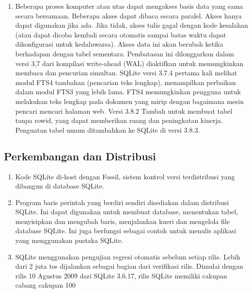 \begin{enumerate}
\begin{enumerate}
			\item Beberapa proses komputer atau utas dapat mengakses basis data yang sama secara bersamaan. Beberapa akses dapat dibaca secara paralel. Akses hanya dapat digunakan jika ada. Jika tidak, akses tulis gagal dengan kode kesalahan (atau dapat dicoba kembali secara otomatis sampai batas waktu dapat dikonfigurasi untuk kedaluwarsa). Akses data ini akan berubah ketika berhadapan dengan tabel sementara. Pembatasan ini dilonggarkan dalam versi 3,7 dari kompilasi write-ahead (WAL) diaktifkan untuk memungkinkan membaca dan pencurian simultan. SQLite versi 3.7.4 pertama kali melihat modul FTS4 tambahan (pencarian teks lengkap), menampilkan perbaikan dalam modul FTS3 yang lebih lama. FTS4 memungkinkan pengguna untuk melakukan teks lengkap pada dokumen yang mirip dengan bagaimana mesin pencari mencari halaman web. Versi 3.8.2 Tambah untuk membuat tabel tanpa rowid, yang dapat memberikan ruang dan peningkatan kinerja. Penguatan tabel umum ditambahkan ke SQLite di versi 3.8.3.
		\end{enumerate}
	\subsection{Perkembangan dan Distribusi}
		\begin{enumerate}
			\item Kode SQLite di-host dengan Fossil, sistem kontrol versi terdistribusi yang dibangun di database SQLite.
			\item Program baris perintah yang berdiri sendiri disediakan dalam distribusi SQLite. Ini dapat digunakan untuk membuat database, menentukan tabel, menyisipkan dan mengubah baris, menjalankan kueri dan mengelola file database SQLite. Ini juga berfungsi sebagai contoh untuk menulis aplikasi yang menggunakan pustaka SQLite.
			\item SQLite menggunakan pengujian regresi otomatis sebelum setiap rilis. Lebih dari 2 juta tes dijalankan sebagai bagian dari verifikasi rilis. Dimulai dengan rilis 10 Agustus 2009 dari SQLite 3.6.17, rilis SQLite memiliki cakupan cabang cakupan 100%
		\end{enumerate}

\end{enumerate}
